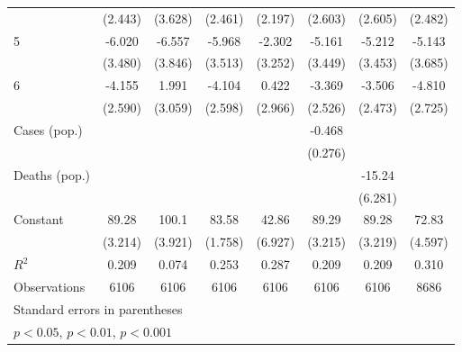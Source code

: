 \documentclass{article}
\begin{document}
{\begin{longtable}{l*{7}{c}}
                &  (2.443)         &  (3.628)         &  (2.461)         &  (2.197)         &  (2.603)         &  (2.605)         &  (2.482)         \\
5               &   -6.020         &   -6.557         &   -5.968         &   -2.302         &   -5.161         &   -5.212         &   -5.143         \\
                &  (3.480)         &  (3.846)         &  (3.513)         &  (3.252)         &  (3.449)         &  (3.453)         &  (3.685)         \\
6               &   -4.155         &    1.991         &   -4.104         &    0.422         &   -3.369         &   -3.506         &   -4.810         \\
                &  (2.590)         &  (3.059)         &  (2.598)         &  (2.966)         &  (2.526)         &  (2.473)         &  (2.725)         \\
Cases (pop.)    &                  &                  &                  &                  &   -0.468         &                  &                  \\
                &                  &                  &                  &                  &  (0.276)         &                  &                  \\
Deaths (pop.)   &                  &                  &                  &                  &                  &   -15.24\sym{*}  &                  \\
                &                  &                  &                  &                  &                  &  (6.281)         &                  \\
Constant        &    89.28\sym{***}&    100.1\sym{***}&    83.58\sym{***}&    42.86\sym{***}&    89.29\sym{***}&    89.28\sym{***}&    72.83\sym{***}\\
                &  (3.214)         &  (3.921)         &  (1.758)         &  (6.927)         &  (3.215)         &  (3.219)         &  (4.597)         \\
\hline
\(R^{2}\)       &    0.209         &    0.074         &    0.253         &    0.287         &    0.209         &    0.209         &    0.310         \\
Observations    &     6106         &     6106         &     6106         &     6106         &     6106         &     6106         &     8686         \\
\hline\hline
\multicolumn{8}{l}{\footnotesize Standard errors in parentheses}\\
\multicolumn{8}{l}{\footnotesize \sym{*} \(p<0.05\), \sym{**} \(p<0.01\), \sym{***} \(p<0.001\)}\\
\end{longtable}
}
\end{document}
